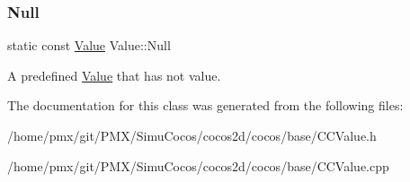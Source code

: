 \subsubsection{\texorpdfstring{Null}{Null}}
{\footnotesize\ttfamily static const \hyperlink{classValue}{Value} Value\+::\+Null\hspace{0.3cm}{\ttfamily [static]}}

A predefined \hyperlink{classValue}{Value} that has not value. 

The documentation for this class was generated from the following files\+:\begin{DoxyCompactItemize}
\item 
/home/pmx/git/\+P\+M\+X/\+Simu\+Cocos/cocos2d/cocos/base/C\+C\+Value.\+h\item 
/home/pmx/git/\+P\+M\+X/\+Simu\+Cocos/cocos2d/cocos/base/C\+C\+Value.\+cpp\end{DoxyCompactItemize}

